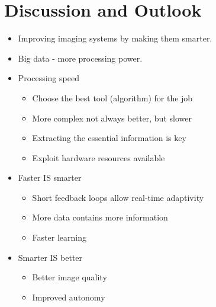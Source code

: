 
\endofdump

\ifRootBuild\else
  
  \makeglossaries
\fi



\chapter{Discussion and Outlook}

\begin{itemize}
\item Improving imaging systems by making them smarter.
\item Big data - more processing power.
\item Processing speed
\begin{itemize}
	\item Choose the best tool (algorithm) for the job
	\item More complex not always better, but slower
	\item Extracting the essential information is key 
	\item Exploit hardware resources available
\end{itemize}
\item Faster IS smarter
 \begin{itemize}
 	\item Short feedback loops allow real-time adaptivity
 	\item More data contains more information
 	\item Faster learning
 \end{itemize}
\item Smarter IS better
 \begin{itemize}
	\item Better image quality
	\item Improved autonomy
\end{itemize}
\end{itemize}



